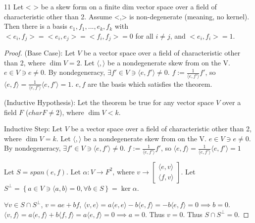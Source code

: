 \documentclass{article}
\newcommand{\angles}[1]{\langle #1 \rangle}
\begin{document}
\begin{PROB}{11}\label{Problem 11.}
    Let < > be a skew form on a finite dim vector space over a field of characteristic other than 2. Assume <,> is non-degenerate (meaning, no kernel). Then there is a basis $e_1,f_1,...,e_k,f_k$
    with $<e_i,f_j> = <e_i,e_j> = <f_i,f_j> = 0$ for all $i \neq j$, and $<e_i,f_i> =1$.  
\end{PROB}
\begin{proof}
    (Base Case): Let $V$ be a vector space over a field of characteristic other than 2, where $\dim V = 2$. Let $\angles{ , }$ be a nondegenerate skew from on the V. $e \in V \ni e \neq 0$. By nondegeneracy, $\exists f' \in V \ni \angles{e, f'} \neq 0$. $f := \frac{1}{\angles{e, f'}}f'$, so $\angles{e, f} = \frac{1}{\angles{e, f'}} \angles{e, f'} = 1$. $e, f$ are the basis which satisfies the theorem.   
    
    (Inductive Hypothesis): Let the theorem be true for any vector space $V$ over a field $F$ ($char F \neq 2$), where $\dim V < k$. 
    
    Inductive Step: Let $V$ be a vector space over a field of characteristic other than 2, where $\dim V = k$. Let $\angles{ , }$ be a nondegenerate skew from on the V. $e \in V \ni e \neq 0$. By nondegeneracy, $\exists f' \in V \ni \angles{e, f'} \neq 0$. $f := \frac{1}{\angles{e, f'}}f'$, so $\angles{e, f} = \frac{1}{\angles{e, f'}} \angles{e, f'} = 1$       
    
    
    Let $S = span(e, f)$. Let $\alpha: V \to F^2$, where $v \to \begin{bmatrix}
        \angles{e, v} \\
        \angles{f, v}
    \end{bmatrix}$. Let $S^\perp = \left\{ a \in V \ni \angles{a, b} = 0, \forall b \in S \right\} = \ker \alpha$. 
    
    $\forall v \in S \cap S^\perp$, $v = ae + bf$, $\angles{v, e} = a\angles{e, e} - b\angles{e, f} = -b\angles{e, f} = 0 \implies b = 0$. $\angles{v, f} = a\angles{e, f} + b\angles{f, f} = a\angles{e, f} = 0 \implies a = 0$. Thus $v = 0$. Thus $S \cap S^\perp = 0$. 
    

\end{proof}
\end{document}
